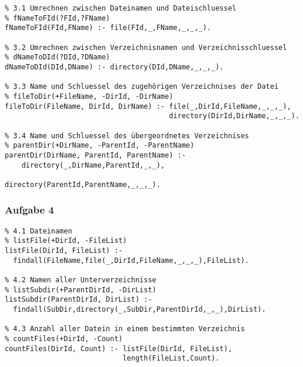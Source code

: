 \documentclass[]{article}
\begin{document}
\begin{verbatim}
% 3.1 Umrechnen zwischen Dateinamen und Dateischluessel
% fNameToFId(?FId,?FName)
fNameToFId(FId,FName) :- file(FId,_,FName,_,_,_).

% 3.2 Umrechnen zwischen Verzeichnisnamen und Verzeichnisschluessel
% dNameToDId(?DId,?DName)
dNameToDId(DId,DName) :- directory(DId,DName,_,_,_).

% 3.3 Name und Schluessel des zugehörigen Verzeichnises der Datei
% fileToDir(+FileName, -DirId, -DirName)
fileToDir(FileName, DirId, DirName) :- file(_,DirId,FileName,_,_,_),
                                       directory(DirId,DirName,_,_,_).

% 3.4 Name und Schluessel des übergeordnetes Verzeichnises
% parentDir(+DirName, -ParentId, -ParentName)
parentDir(DirName, ParentId, ParentName) :-
    directory(_,DirName,ParentId,_,_),
																						directory(ParentId,ParentName,_,_,_).
\end{verbatim}

\subsubsection{Aufgabe 4}\label{header-n110}

\begin{verbatim}
% 4.1 Dateinamen
% listFile(+DirId, -FileList)
listFile(DirId, FileList) :- 
  findall(FileName,file(_,DirId,FileName,_,_,_),FileList).

% 4.2 Namen aller Unterverzeichnisse
% listSubdir(+ParentDirId, -DirList)
listSubdir(ParentDirId, DirList) :- 
  findall(SubDir,directory(_,SubDir,ParentDirId,_,_),DirList).

% 4.3 Anzahl aller Datein in einem bestimmten Verzeichnis
% countFiles(+DirId, -Count) 
countFiles(DirId, Count) :- listFile(DirId, FileList),
                            length(FileList,Count).
\end{verbatim}
\end{document}
